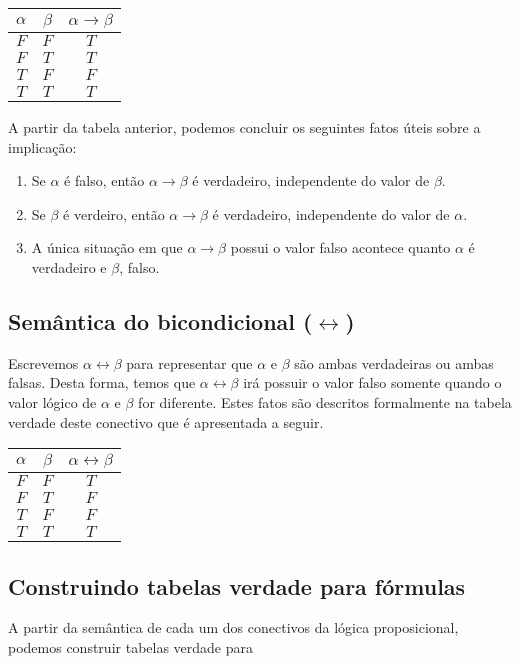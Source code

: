 \begin{table}[h]
  \begin{tabular}{|c|c|c|}
    \hline
    $\alpha$ & $\beta$ & $\alpha \to \beta$\\ \hline
    $F$         & $F$        & $T$ \\ \hline
    $F$         & $T$        & $T$ \\ \hline
    $T$         & $F$        & $F$ \\ \hline
    $T$         & $T$        & $T$ \\ \hline
   \end{tabular}
  \centering
\end{table}

A partir da tabela anterior, podemos concluir os seguintes fatos
\'uteis sobre a implica\c{c}\~ao: 
\begin{enumerate}
   \item Se $\alpha$ \'e falso, ent\~ao $\alpha\to\beta$ \'e
     verdadeiro, independente do valor de $\beta$.
   \item Se $\beta$ \'e verdeiro, ent\~ao $\alpha\to\beta$ \'e
     verdadeiro, independente do valor de $\alpha$.
   \item A \'unica situa\c{c}\~ao em que $\alpha\to\beta$ possui o
     valor falso acontece quanto $\alpha$ \'e verdadeiro e $\beta$, falso.
\end{enumerate}

\subsection{Sem\^antica do bicondicional ($\leftrightarrow$)}

Escrevemos $\alpha\leftrightarrow\beta$ para representar que $\alpha$
e $\beta$ s\~ao ambas verdadeiras ou ambas falsas. Desta forma, temos
que $\alpha\leftrightarrow\beta$ ir\'a possuir o valor falso somente
quando o valor l\'ogico de $\alpha$ e $\beta$ for diferente. Estes
fatos s\~ao descritos formalmente na tabela verdade deste conectivo
que \'e apresentada a seguir.

\begin{table}[h]
  \begin{tabular}{|c|c|c|}
    \hline
    $\alpha$ & $\beta$ & $\alpha \leftrightarrow \beta$\\ \hline
    $F$         & $F$        & $T$ \\ \hline
    $F$         & $T$        & $F$ \\ \hline
    $T$         & $F$        & $F$ \\ \hline
    $T$         & $T$        & $T$ \\ \hline
   \end{tabular}
  \centering
\end{table}


\subsection{Construindo tabelas verdade para f\'ormulas}

A partir da sem\^antica de cada um dos conectivos da l\'ogica
proposicional, podemos construir tabelas verdade para 